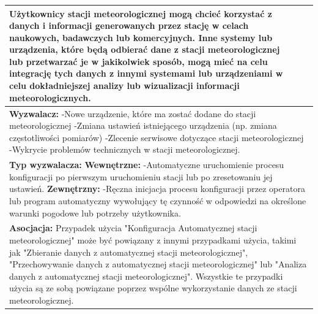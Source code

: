\documentclass{article}
\begin{document}
\begin{center}
\begin{center}
\begin{tabular}{|l|l|l|}
{        \textbf{Użytkownicy} stacji meteorologicznej mogą chcieć korzystać z danych i informacji generowanych przez stację w celach naukowych, badawczych lub komercyjnych.
        \newline
        \textbf{Inne systemy lub urządzenia}, które będą odbierać dane z stacji meteorologicznej lub przetwarzać je w jakikolwiek sposób, mogą mieć na celu integrację tych danych z innymi systemami lub urządzeniami w celu dokładniejszej analizy lub wizualizacji informacji meteorologicznych.} \\
        \hline
        \hline
        \multicolumn{3}{|p{\dimexpr\linewidth-2\tabcolsep-2\arrayrulewidth}|}{\textbf{Wyzwalacz:}
        \newline
        -Nowe urządzenie, które ma zostać dodane do stacji meteorologicznej
        \newline
        -Zmiana ustawień istniejącego urządzenia (np. zmiana częstotliwości pomiarów)
        \newline
        -Zlecenie serwisowe dotyczące stacji meteorologicznej
        \newline
        -Wykrycie problemów technicznych w stacji meteorologicznej.} \\
        \hline
        \hline
        \multicolumn{3}{|p{\dimexpr\linewidth-2\tabcolsep-2\arrayrulewidth}|}{\textbf{Typ wyzwalacza:}
        \newline
        \textbf{Wewnętrzne:}
        \newline 
        -Automatyczne uruchomienie procesu konfiguracji po pierwszym uruchomieniu stacji lub po zresetowaniu jej ustawień. 
        \newline
        \textbf{Zewnętrzny:}
        \newline
        -Ręczna inicjacja procesu konfiguracji przez operatora lub program automatyczny wywołujący tę czynność w odpowiedzi na określone warunki pogodowe lub potrzeby użytkownika.} \\
        \hline
        \hline
        \multicolumn{3}{|p{\dimexpr\linewidth-2\tabcolsep-2\arrayrulewidth}|}{\textbf{Asocjacja:}
        \newline
        Przypadek użycia "Konfiguracja Automatycznej stacji meteorologicznej" może być powiązany
        z innymi przypadkami użycia, takimi jak "Zbieranie danych z automatycznej stacji meteorologicznej",
        "Przechowywanie danych z automatycznej stacji meteorologicznej" lub "Analiza danych z automatycznej stacji meteorologicznej".
        Wszystkie te przypadki użycia są ze sobą powiązane poprzez wspólne wykorzystanie danych ze stacji meteorologicznej.} \\

\end{tabular}
\end{center}
\end{center}
\end{document}
